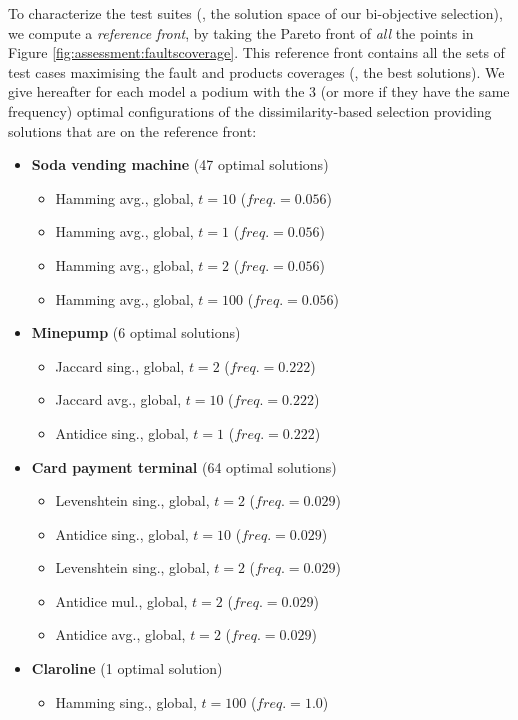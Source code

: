 To characterize the test suites (\ie, the solution space of our bi-objective selection), we compute a \emph{reference front}, by taking the Pareto front of \emph{all} the points in Figure \ref{fig:assessment:faultscoverage}. This reference front contains all the sets of test cases maximising the fault and products coverages (\ie, the best solutions). We give hereafter for each model a podium with the 3 (or more if they have the same frequency) optimal configurations of the dissimilarity-based selection providing solutions that are on the reference front:
\begin{itemize}
\item \textbf{Soda vending machine} (47 optimal solutions)
	\begin{itemize}
	\item Hamming avg., global, $t=10$ ($freq. = 0.056$)
	\item Hamming avg., global, $t=1$ ($freq. = 0.056$)
	\item Hamming avg., global, $t=2$ ($freq. = 0.056$)
	\item Hamming avg., global, $t=100$ ($freq. = 0.056$)
	\end{itemize}
\item \textbf{Minepump} (6 optimal solutions)
	\begin{itemize}
	\item Jaccard sing., global, $t=2$ ($freq. = 0.222$)
	\item Jaccard avg., global, $t=10$ ($freq. = 0.222$)
	\item Antidice sing., global, $t=1$ ($freq. = 0.222$)
	\end{itemize}
\item \textbf{Card payment terminal} (64 optimal solutions)
	\begin{itemize}
	\item Levenshtein sing., global, $t=2$ ($freq. = 0.029$)
	\item Antidice sing., global, $t=10$ ($freq. = 0.029$)
	\item Levenshtein sing., global, $t=2$ ($freq. = 0.029$)
	\item Antidice mul., global, $t=2$ ($freq. = 0.029$)
	\item Antidice avg., global, $t=2$ ($freq. = 0.029$)
	\end{itemize}
\item \textbf{Claroline} (1 optimal solution)
	\begin{itemize}
	\item Hamming sing., global, $t=100$ ($freq. = 1.0$)
	\end{itemize}
\end{itemize}



